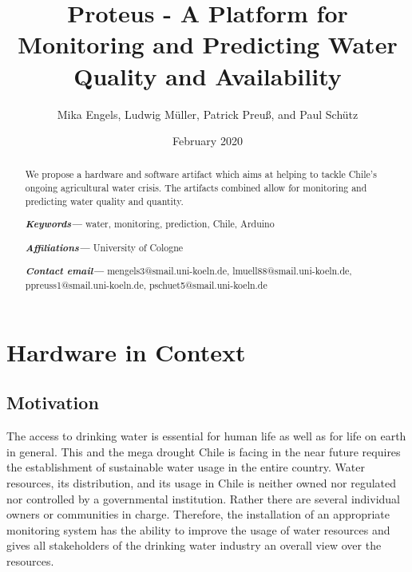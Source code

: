\documentclass[11pt, letterpaper]{article}
\title{Proteus - A Platform for Monitoring and Predicting Water Quality and Availability}
\author{Mika Engels, Ludwig M\"uller, Patrick Preu\ss{}, and Paul Sch\"utz}
\date{February 2020}
\begin{document}
\maketitle

\begin{abstract}
	We propose a hardware and software artifact which aims at helping to tackle Chile's ongoing agricultural water crisis. The artifacts combined allow for monitoring and predicting water quality and quantity.
	
	\smallskip
	\noindent \small \textbf{\textit{Keywords---}} water, monitoring, prediction, Chile, Arduino
	
	\smallskip
	\noindent \small \textbf{\textit{Affiliations---}} University of Cologne
	
	\smallskip
	\noindent \small \textbf{\textit{Contact email---}} mengels3@smail.uni-koeln.de, lmuell88@smail.uni-koeln.de, ppreuss1@smail.uni-koeln.de, pschuet5@smail.uni-koeln.de
\end{abstract}


\section{Hardware in Context}
\subsection{Motivation}
The access to drinking water is essential for human life as well as for life on earth in general. This and the mega drought Chile is facing in the near future requires the establishment of sustainable water usage in the entire country. Water resources, its distribution, and its usage in Chile is neither owned nor regulated nor controlled by a governmental institution. Rather there are several individual owners or communities in charge. Therefore, the installation of an appropriate monitoring system has the ability to improve the usage of water resources and gives all stakeholders of the drinking water industry an overall view over the resources. 
\newline
\end{document}
